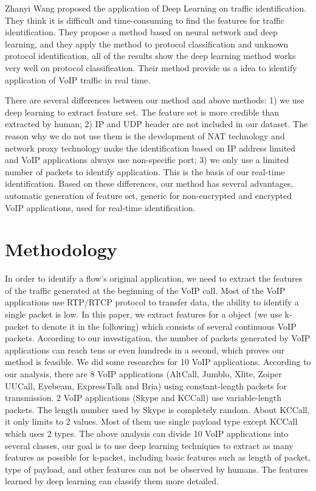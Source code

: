 \documentclass[conference]{IEEEtran}
\begin{document}
Zhanyi Wang \cite{1} proposed the application of Deep Learning on traffic identification. They think it is difficult and time-consuming to find the features for traffic identification. They propose a method based on neural network and deep learning, and they apply the method to protocol classification and unknown protocol identification, all of the results show the deep learning method works very well on protocol classification. Their method provide us a idea to identify application of VoIP traffic in real time.

There are several differences between our method and above methods: 1) we use deep learning to extract feature set. The feature set is more credible than extracted by human; 2) IP and UDP header are not included in our dataset. The reason why we do not use them is the development of NAT technology and network proxy technology make the identification based on IP address limited and VoIP applications always use non-specific port; 3) we only use a limited number of packets to identify application. This is the basis of our real-time identification. Based on these differences, our method has several advantages, automatic generation of feature set, generic for non-encrypted and encrypted VoIP applications, used for real-time identification.

\section{Methodology}
\label{sec:methodology}
In order to identify a flow's original application, we need to extract the features of the traffic generated at the beginning of the VoIP call. Most of the VoIP applications use RTP/RTCP protocol to transfer data, the ability to identify a single packet is low. In this paper, we extract features for a object (we use k-packet to denote it in the following) which consists of several continuous VoIP packets. According to our investigation, the number of packets generated by VoIP applications can reach tens or even hundreds in a second, which proves our method is feasible. We did some researches for 10 VoIP applications. According to our analysis, there are 8 VoIP applications (AltCall, Jumblo, Xlite, Zoiper UUCall, Eyebeam, ExpressTalk and Bria) using constant-length packets for transmission. 2 VoIP applications (Skype and KCCall) use variable-length packets. The length number used by Skype is completely random. About KCCall, it only limits to 2 values. Most of them use single payload type except KCCall which uses 2 types. The above analysis can divide 10 VoIP applications into several classes, our goal is to use deep learning techniques to extract as many features as possible for k-packet, including basic features such as length of packet, type of payload, and other features can not be observed by humans. The features learned by deep learning can classify them more detailed.
\end{document}
